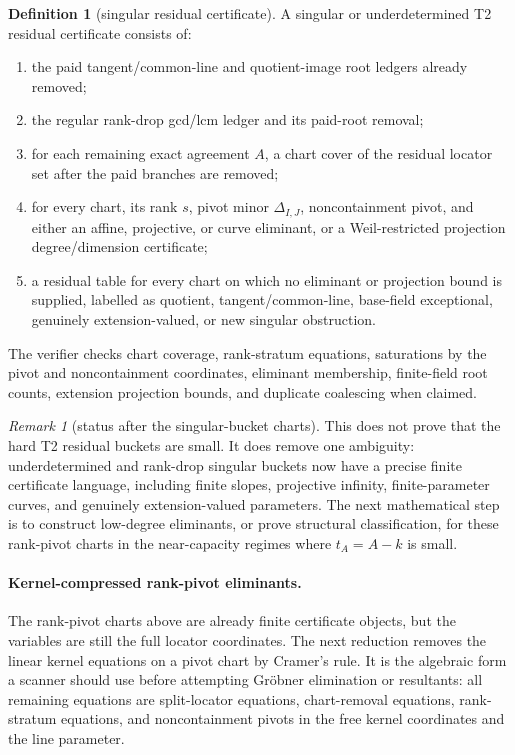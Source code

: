 \documentclass[11pt]{article}
\theoremstyle{definition}
\newtheorem{definition}[theorem]{Definition}
\theoremstyle{remark}
\newtheorem{remark}[theorem]{Remark}
\begin{document}
\begin{definition}[singular residual certificate]
\label{def:singular-residual-certificate}
A singular or underdetermined T2 residual certificate consists of:
\begin{enumerate}[label=\textup{(\roman*)},leftmargin=2.2em]
\item the paid tangent/common-line and quotient-image root ledgers already
removed;
\item the regular rank-drop gcd/lcm ledger and its paid-root removal;
\item for each remaining exact agreement $A$, a chart cover of the residual
locator set after the paid branches are removed;
\item for every chart, its rank $s$, pivot minor $\Delta_{I,J}$, noncontainment
pivot, and either an affine, projective, or curve eliminant, or a
Weil-restricted projection degree/dimension certificate;
\item a residual table for every chart on which no eliminant or projection bound
is supplied, labelled as quotient, tangent/common-line, base-field exceptional,
genuinely extension-valued, or new singular obstruction.
\end{enumerate}
The verifier checks chart coverage, rank-stratum equations, saturations by the
pivot and noncontainment coordinates, eliminant membership, finite-field root
counts, extension projection bounds, and duplicate coalescing when claimed.
\end{definition}

\begin{remark}[status after the singular-bucket charts]
\label{rem:singular-bucket-chart-status}
This does not prove that the hard T2 residual buckets are small.  It does remove
one ambiguity: underdetermined and rank-drop singular buckets now have a precise
finite certificate language, including finite slopes, projective infinity,
finite-parameter curves, and genuinely extension-valued parameters.  The next
mathematical step is to construct low-degree eliminants, or prove structural
classification, for these rank-pivot charts in the near-capacity regimes where
$t_A=A-k$ is small.
\end{remark}


\paragraph{Kernel-compressed rank-pivot eliminants.}
The rank-pivot charts above are already finite certificate objects, but the
variables are still the full locator coordinates.  The next reduction removes the
linear kernel equations on a pivot chart by Cramer's rule.  It is the algebraic
form a scanner should use before attempting Gr\"obner elimination or resultants:
all remaining equations are split-locator equations, chart-removal equations,
rank-stratum equations, and noncontainment pivots in the free kernel coordinates
and the line parameter.
\end{document}
